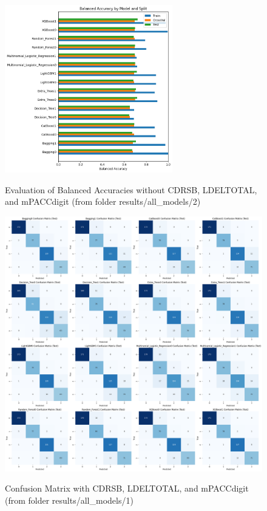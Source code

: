\begin{figure}[H]
	\centering
	\includegraphics[width=0.65\textwidth]{images/2_Evaluation.png}
	\label{fig:Evaluation without CDRSB, LDELTOTAL, and mPACCdigit}
	\caption{Evaluation of Balanced Accuracies without CDRSB, LDELTOTAL, and mPACCdigit (from folder results/all\_models/2)}
\end{figure}

\newpage

\begin{figure}[H]
	\centering
	\includegraphics[width=1\textwidth]{images/1_Confusion_Matrix.png}
	\label{fig:Confusion Matrix with CDRSB, LDELTOTAL, and mPACCdigit}
	\caption{Confusion Matrix with CDRSB, LDELTOTAL, and mPACCdigit (from folder results/all\_models/1)}
\end{figure} 

